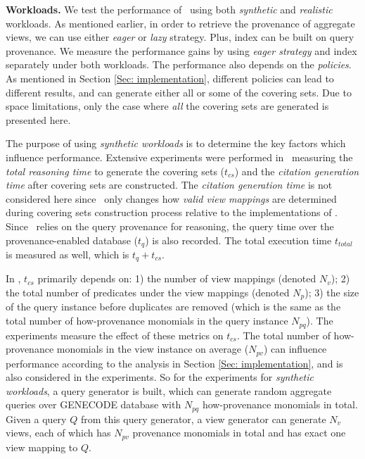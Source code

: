 {\bf Workloads.} 
We test the performance of \provalg\ using both {\em synthetic} and {\em realistic} workloads. As mentioned earlier, in order to retrieve the provenance of aggregate views, we can use either {\em eager} or {\em lazy} strategy. Plus, index can be built on query provenance. We measure the performance gains by using {\em eager strategy} and index separately under both workloads. The performance also depends on the {\em policies}. As mentioned in Section \ref{Sec: implementation}, different policies can lead to different results, and can generate either all or some of the covering sets. Due to space limitations, only the case where {\em all} the covering sets are generated is presented here.

The purpose of using {\em synthetic workloads} is to determine the key factors which influence performance. 
Extensive experiments were performed in~\cite{wu2018data} measuring the \textit{total reasoning time}  to generate the covering sets ($t_{cs}$) and the \textit{citation generation time}   after covering sets are constructed.  The \textit{citation generation time} is not considered here since \provalg\ only changes how {\em valid view mappings} are determined during covering sets construction process %
relative to the implementations of \rba. Since \provalg\ relies on the query provenance for reasoning, the query time over the provenance-enabled database ($t_{q}$) is also recorded. The total execution time $t_{total}$ is measured as well, which is $t_q+t_{cs}$.


In \cite{wu2018data}, $t_{cs}$ primarily depends on: 1) the number of view mappings (denoted $N_v$); 2) the total number of predicates under the view mappings (denoted $N_p$); 3) the size of the query instance before duplicates are removed (which is the same as the total number of how-provenance monomials in the query instance $N_{pq}$). The experiments measure the effect of these metrics on $t_{cs}$. %
The total number of how-provenance monomials in the view instance on average ($N_{pv}$) can influence performance according to the analysis in Section \ref{Sec: implementation}, and is also considered in the experiments. So for the experiments for {\em synthetic workloads}, a query generator is built, which can generate random aggregate queries over GENECODE database with $N_{pq}$ how-provenance monomials in total. Given a query $Q$ from this query generator, a view generator can generate $N_v$ views, each of which has $N_{pv}$ provenance monomials in total and has exact one view mapping to $Q$. 

